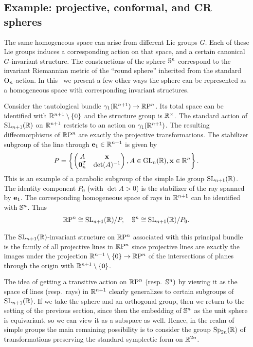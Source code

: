 \subsection{Example: projective, conformal, and CR spheres}\label{sec: projective, conformal CR spheres}

The same homogeneous space can arise from different Lie groups $G$. Each of these Lie groups induces a corresponding action on that space, and a certain canonical $G$-invariant structure. The constructions of the sphere $\bbS^n$ correspond to the invariant Riemannian metric of the ``round sphere'' inherited from the standard $\Or_n$-action. In this \subsect\ we present a few other ways the sphere can be represented as a homogeneous space with corresponding invariant structures.

\begin{defn}
    Consider the tautological bundle $\gamma_1(\bbR^{n+1})\to \RP^n$. Its total space can be identified with $\bbR^{n+1}\setminus\{0\}$ and the structure group is $\bbR^\times$. The standard action of $\SL_{n+1}(\bbR)$ on $\bbR^{n+1}$ restricts to an action on $\gamma_1(\bbR^{n+1})$. The resulting diffeomorphisms of $\RP^n$ are exactly the projective transformations. The stabilizer subgroup of the line through $\bf{e}_1\in\bbR^{n+1}$ is given by
    \[P=\left\{\begin{pmatrix}
        A&\bf{x}\\
        \bf{0}_n^T&\det(A)^{-1}\end{pmatrix}, A\in\GL_n(\bbR),\bf{x}\in\bbR^{n}\right\}.\]
    This is an example of a parabolic subgroup of the simple Lie group $\SL_{n+1}(\bbR)$. 
    The identity component $P_0$ (with $\det A>0$) is the stabilizer of the ray spanned by $\bf{e}_1$. The corresponding homogeneous space of rays in $\bbR^{n+1}$ can be identified with $\bbS^n$.
    Thus
    \[\RP^n\cong \SL_{n+1}(\bbR)\slash P,\quad \bbS^n\cong  \SL_{n+1}(\bbR)\slash P_0.\]
\end{defn}

The $\SL_{n+1}(\bbR)$-invariant structure on $\RP^n$ associated with this principal bundle is the family of all projective lines in $\RP^n$ since projective lines are exactly the images under the projection $\bbR^{n+1}\setminus\{0\}\to \RP^n$ of the intersections of planes through the origin with $\bbR^{n+1}\setminus\{0\}$.

The idea of getting a transitive action on $\RP^n$ (resp.~$\bbS^n)$ by viewing it as the space of lines (resp.~rays) in $\bbR^{n+1}$ clearly generalizes to certain subgroups of $\SL_{n+1}(\bbR)$. If we take the sphere and an orthogonal group, then we return to the setting of the previous section, since then the embedding of $\bbS^n$ as the unit sphere is equivariant, so we can view it as a subspace as well. Hence, in the realm of simple groups the main remaining possibility is to consider the group $\Sp_{2n}(\bbR)$ of transformations preserving the standard symplectic form on $\bbR^{2n}$.

